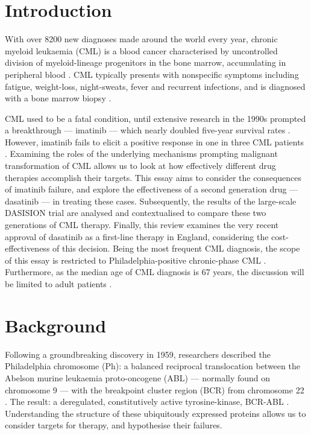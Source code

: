 \section{Introduction}
With over 8200 new diagnoses made around the world every year, chronic myeloid leukaemia (CML) is a blood cancer characterised by uncontrolled division of myeloid-lineage progenitors in the bone marrow, accumulating in peripheral blood \citep{RefWorks:doc:58309926e4b05b192d72d473}. CML typically presents with nonspecific symptoms including fatigue, weight-loss, night-sweats, fever and recurrent infections, and is diagnosed with a bone marrow biopsy \citep{RefWorks:doc:583b173fe4b066125b214e79}.

CML used to be a fatal condition, until extensive research in the 1990s prompted a breakthrough --- imatinib --- which nearly doubled five-year survival rates \citep{RefWorks:doc:583b0619e4b066125b214bec}. However, imatinib fails to elicit a positive response in one in three CML patients \citep{RefWorks:doc:583b5609e4b066125b215900}. Examining the roles of the underlying mechanisms prompting malignant transformation of CML allows us to look at how effectively different drug therapies accomplish their targets.
This essay aims to consider the consequences of imatinib failure, and explore the effectiveness of a second generation drug --- dasatinib --- in treating these cases. Subsequently, the results of the large-scale DASISION trial are analysed and contextualised to compare these two generations of CML therapy. Finally, this review examines the very recent approval of dasatinib as a first-line therapy in England, considering the cost-effectiveness of this decision. Being the most frequent CML diagnosis, the scope of this essay is restricted to Philadelphia-positive chronic-phase CML \citep{RefWorks:doc:58309926e4b05b192d72d473}. Furthermore, as the median age of CML diagnosis is 67 years, the discussion will be limited to adult patients \citep{RefWorks:doc:58309926e4b05b192d72d473}.

\section{Background}

Following a groundbreaking discovery in 1959, researchers described the Philadelphia chromosome (Ph): a balanced reciprocal translocation between the Abelson murine leukaemia proto-oncogene (ABL) --- normally found on chromosome 9 --- with the breakpoint cluster region (BCR) from chromosome 22 \citep{RefWorks:doc:58309b92e4b05b192d72d4da,RefWorks:doc:58309bb1e4b047a10adac048,RefWorks:doc:58309b12e4b047a10adac03d,RefWorks:doc:58309a92e4b0de15c9d88743}. The result: a deregulated, constitutively active tyrosine-kinase, BCR-ABL \citep{RefWorks:doc:58309bd3e4b05b192d72d4eb}. Understanding the structure of these ubiquitously expressed proteins allows us to consider targets for therapy, and hypothesise their failures.

